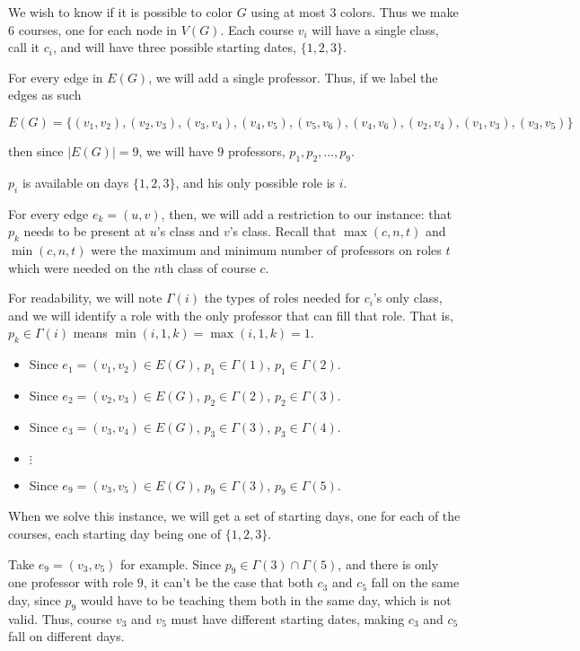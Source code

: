 We wish to know if it is possible to color $G$ using at most $3$ colors. Thus we make $6$ courses, one for each node in $V(G)$. Each course $v_i$ will have a single class, call it $c_i$, and will have three possible starting dates, $\{1, 2, 3\}$.

For every edge in $E(G)$, we will add a single professor. Thus, if we label the edges as such

$$
E(G) = \{(v_1, v_2), (v_2, v_3), (v_3, v_4), (v_4, v_5), (v_5, v_6), (v_4, v_6), (v_2, v_4), (v_1, v_3), (v_3, v_5)\}
$$

then since $|E(G)| = 9$, we will have $9$ professors, $p_1, p_2, \dots, p_9$.

$p_i$ is available on days $\{1, 2, 3\}$, and his only possible role is $i$.

For every edge $e_k = (u, v)$, then, we will add a restriction to our instance: that $p_k$ needs to be present at $u$'s class and $v$'s class. Recall that $\max(c, n, t)$ and $\min(c, n, t)$ were the maximum and minimum number of professors on roles $t$ which were needed on the $n$th class of course $c$.

For readability, we will note $\Gamma(i)$ the types of roles needed for $c_i$'s only class, and we will identify a role with the only professor that can fill that role. That is, $p_k \in \Gamma(i)$ means $\min(i, 1, k) = \max(i, 1, k) = 1$.

\newcommand{\restrict}[3]{\item Since $e_#3 = (v_#1, v_#2) \in E(G)$, $p_#3 \in \Gamma(#1)$, $p_#3 \in \Gamma(#2)$.}

\begin{itemize}
\restrict{1}{2}{1}
\restrict{2}{3}{2}
\restrict{3}{4}{3}
\item $\vdots$
\restrict{3}{5}{9}
\end{itemize}

When we solve this instance, we will get a set of starting days, one for each of the courses, each starting day being one of $\{1, 2, 3\}$.

Take $e_9 = (v_3, v_5)$ for example. Since $p_9 \in \Gamma(3) \cap \Gamma(5)$, and there is only one professor with role $9$, it can't be the case that both $c_3$ and $c_5$ fall on the same day, since $p_9$ would have to be teaching them both in the same day, which is not valid. Thus, course $v_3$ and $v_5$ must have different starting dates, making $c_3$ and $c_5$ fall on different days.


